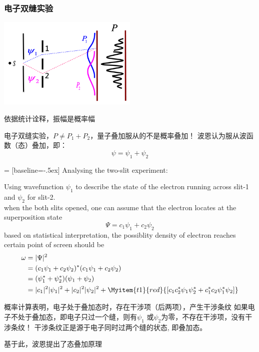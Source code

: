  
 \begin{frame}
     \frametitle{电子双缝实验}
     \begin{center}
         \includegraphics[width=0.5\textwidth]{figs/sup-3.png} \\
     \end{center} 
     依据统计诠释，振幅是概率幅\\
     \begin{itemize}
         \Item 电子双缝实验，$P\neq P_1+P_2 $，量子叠加服从的不是概率叠加！
         \Item 波恩认为服从波函数（态）叠加，即：
         $$ \psi =\psi_1+\psi_2$$
     \end{itemize}
 \end{frame} 
 
 
 \begin{frame} [allowframebreaks=]
      = [baseline=-.5ex]
     Analysing the two-slit experiment:\\
     \begin{itemize}
         \Item Using wavefunction $\psi_1$ to describe the state of the electron running across slit-1 and $\psi_2$ for slit-2. \\
         \Item when the both slits opened, one can assume that the electron locates at the superposition state
             \[ \Psi=c_1 \psi_1+ c_2\psi_2 \]
         \Item based on statistical interpretation, the possiblity density of electron reaches certain point of screen should be
         \begin{equation*}
         \begin{split}
             \omega &=|\Psi|^2 \\
             &= (c_1 \psi_1+ c_2\psi_2)^* (c_1 \psi_1+ c_2\psi_2) \\
             &=(\psi_1^*+\psi_2^*)(\psi_1+\psi_2) \\ 
             & = |c_1|^2 |\psi_1|^2 + |c_2|^2 |\psi_2|^2  
             + \Myitem{t1}{red}{[c_1 c_2 ^* \psi_1 \psi_2 ^* + c_1 ^* c_2 \psi_1 ^* \psi_2]} \\
         \end{split} 
         \end{equation*}
     \end{itemize}
     \begin{itemize}
         \Item 概率计算表明，电子处于叠加态时，存在干涉项（后两项），产生干涉条纹
         \Item 如果电子不处于叠加态，即电子只过一个缝，则有$\psi_1$ 或$\psi_2$为零，不存在干涉项，没有干涉条纹！
         \Item 干涉条纹正是源于电子同时过两个缝的状态, 即叠加态。
     \end{itemize}
     基于此，波恩提出了态叠加原理
 \end{frame}
 
